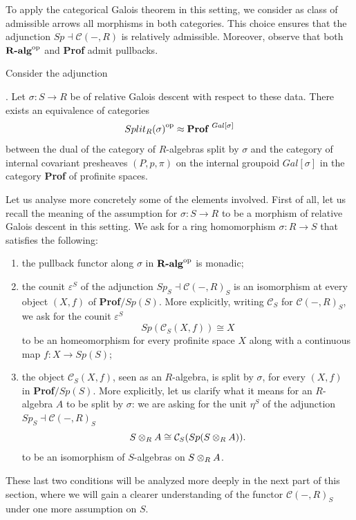 To apply the categorical Galois theorem in this setting, we consider as class of admissible arrows all morphisms in both categories. This choice ensures that the adjunction $Sp\dashv\mathcal{C}(-,R)$ is relatively admissible. Moreover, observe that both ${\textbf{R-alg}}^{\mathrm{op}}$ and \textbf{Prof} admit pullbacks.
\begin{theorem}
\label{thm:GaloisTheoremRing}
    Consider the adjunction
    . Let $\sigma:S\to R$ be of relative Galois descent with respect to these data. There exists an equivalence of categories
    \[ {Split_R(\sigma)}^{\mathrm{op}}\approx{\textbf{Prof }}^{Gal[\sigma]} \]
    between the dual of the category of $R$-algebras split by $\sigma$ and the category of internal covariant presheaves $(P,p,\pi)$ on the internal groupoid $Gal[\sigma]$ in the category \textbf{Prof} of profinite spaces.
\end{theorem}

Let us analyse more concretely some of the elements involved. First of all, let us recall the meaning of the assumption for $\sigma:S\to R$ to be a morphism of relative Galois descent in this setting. We ask for a ring homomorphism $\sigma:R\to S$ that satisfies the following:
\begin{enumerate}
    \item the pullback functor along $\sigma$ in ${\textbf{R-alg}}^{\mathrm{op}}$ is monadic;
    \item the counit $\varepsilon^S$ of the adjunction $Sp_S\dashv{\mathcal{C}(-,R)}_S$ is an isomorphism at every object $(X,f)$ of \textbf{Prof}$/Sp(S)$. More explicitly, writing $\mathcal{C}_S$ for ${\mathcal{C}(-,R)}_S$, we ask for the counit $\varepsilon^S$
    \[ Sp( \mathcal{C}_S(X,f) )\cong X \]
    to be an homeomorphism for every profinite space $X$ along with a continuous map $f:X\to Sp(S)$;
    \item the object $\mathcal{C}_S(X,f)$, seen as an $R$-algebra, is split by $\sigma$, for every $(X,f)$ in \textbf{Prof}$/Sp(S)$. More explicitly, let us clarify what it means for an $R$-algebra $A$ to be split by $\sigma$: we are asking for the unit $\eta^S$ of the adjunction $Sp_S\dashv{\mathcal{C}(-,R)}_S$
    \[ S\otimes_{R}A\cong\mathcal{C}_S(Sp(S\otimes_{R}A)). \]
    to be an isomorphism of $S$-algebras on $S\otimes_{R}A$.
\end{enumerate}
These last two conditions will be analyzed more deeply in the next part of this section, where we will gain a clearer understanding of the functor ${\mathcal{C}(-,R)}_S$ under one more assumption on $S$.


